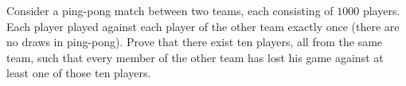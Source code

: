 Consider a ping-pong match between two teams, each consisting of $1000$ players. Each player played against each player of the other team exactly once (there are no draws in ping-pong). Prove that there exist ten players, all from the same team, such that every member of the other team has lost his game against at least one of those ten players.